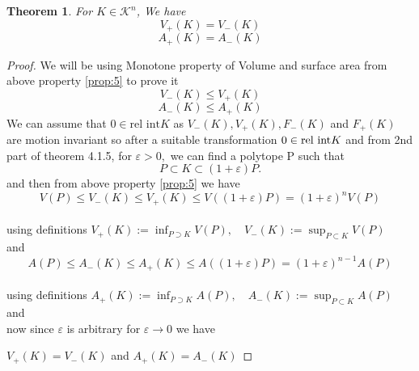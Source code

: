 \documentclass[oneside]{book}
\newtheorem{theorem}{Theorem}[section]
\begin{document}
\begin{theorem} 	
\label{t:9}
For $K \in \mathcal{K}^{n}$, We have 
\begin{equation}
\label{eq46}
 V_{+}(K)=V_{-}(K)
\end{equation}
   \begin{equation}
   \label{eq47}
   A_{+}(K)=A_{-}(K)
   \end{equation}
\end{theorem}         
\begin{proof}
We will be using Monotone property of Volume and surface area from above property \ref{prop:5} to prove it \\
$$V_{-}(K) \leq V_{+}(K)  $$  $$ A_{-}(K) \leq A_{+}(K)$$
We can assume that $0 \in \text{rel int} K$ as  $V_{-}(K), V_{+}(K), F_{-}(K)$ and $F_{+}(K)$ are \newline motion invariant so after a suitable transformation
 $0 \in \text{\text{\text{rel int}}} K$ 
 and from 2nd part of theorem 4.1.5,
for $\varepsilon>0,$ we can find a polytope P such that 
$$P \subset K \subset(1+\varepsilon) P .$$
\newpage
and then from above property \ref{prop:5} we have \\ 
\[
V(P) \leq V_{-}(K) \leq V_{+}(K) \leq V((1+\varepsilon) P)=(1+\varepsilon)^{n} V(P)
\] \\
using definitions $ V_{+}(K):=\inf _{P \supset K} V(P), \quad V_{-}(K):=\sup _{P \subset K} V(P)$ \\
and   \\
\[
A(P) \leq A_{-}(K) \leq A_{+}(K) \leq A((1+\varepsilon) P)=(1+\varepsilon)^{n-1} A(P)
\]  \\using definitions 
$ A_{+}(K):=\inf _{P \supset K} A(P), \quad A_{-}(K):=\sup _{P \subset K} A(P) $
 and \\ 
 
 now since $\varepsilon $ is arbitrary for $\varepsilon \rightarrow 0$ we have 
 
 $V_{+}(K)=V_{-}(K)$ and  $A_{+}(K)=A_{-}(K)$
 \end{proof}
 
\end{document}
